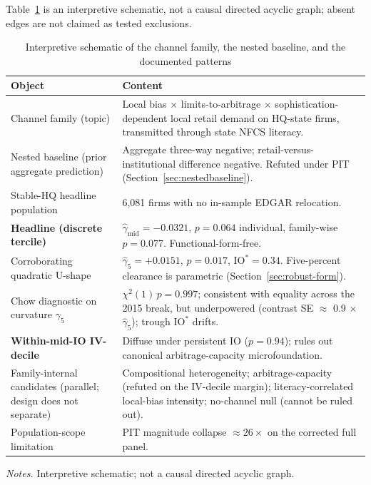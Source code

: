 Table~\ref{tab:schematic} is an interpretive schematic, not a causal directed acyclic graph; absent edges are not claimed as tested exclusions.

\begin{table}[t]
\centering
\caption{Interpretive schematic of the channel family, the nested baseline, and the documented patterns}
\label{tab:schematic}
\footnotesize
\begin{minipage}{0.95\textwidth}
\centering
\begin{tabular}{|p{}|p{}|}
\hline
\textbf{Object} & \textbf{Content} \\
\hline
Channel family (topic) & Local bias $\times$ limits-to-arbitrage $\times$ sophistication-dependent local retail demand on HQ-state firms, transmitted through state NFCS literacy. \\
\hline
Nested baseline (prior aggregate prediction) & Aggregate three-way negative; retail-versus-institutional difference negative. Refuted under PIT (Section~\ref{sec:nestedbaseline}). \\
\hline
Stable-HQ headline population & 6{,}081 firms with no in-sample EDGAR relocation. \\
\hline
\textbf{Headline (discrete tercile)} & $\hat\gamma_{\text{mid}} = -0.0321$, $p = 0.064$ individual, family-wise $p = 0.077$. Functional-form-free. \\
\hline
Corroborating quadratic U-shape & $\hat\gamma_{5} = +0.0151$, $p = 0.017$, $\mathrm{IO}^{\ast} = 0.34$. Five-percent clearance is parametric (Section~\ref{sec:robust-form}). \\
\hline
Chow diagnostic on curvature $\gamma_{5}$ & $\chi^{2}(1)\,p = 0.997$; consistent with equality across the 2015 break, but underpowered (contrast SE $\approx$ 0.9 $\times$ $\hat\gamma_{5}$); trough $\mathrm{IO}^{\ast}$ drifts. \\
\hline
\textbf{Within-mid-IO IV-decile} & Diffuse under persistent IO ($p = 0.94$); rules out canonical arbitrage-capacity microfoundation. \\
\hline
Family-internal candidates (parallel; design does not separate) & Compositional heterogeneity; arbitrage-capacity (refuted on the IV-decile margin); literacy-correlated local-bias intensity; no-channel null (cannot be ruled out). \\
\hline
Population-scope limitation & PIT magnitude collapse $\approx 26\times$ on the corrected full panel. \\
\hline
\end{tabular}
\end{minipage}

\medskip
{\footnotesize\textit{Notes.} Interpretive schematic; not a causal directed acyclic graph.}
\end{table}

